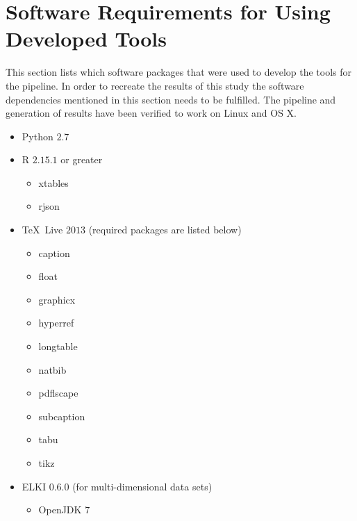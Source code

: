 ﻿\appendix
\renewcommand\thefigure{\thesection.\arabic{figure}}
\renewcommand\thetable{\thesection.\arabic{table}}
\setcounter{figure}{0}
\setcounter{table}{0}


\clearpage
\section{Software Requirements for Using Developed Tools}
\label{sec:appendix-pipelinereqs}
This section lists which software packages that were used to develop the tools for the pipeline. In order to recreate the results of this study the software dependencies mentioned in this section needs to be fulfilled. The pipeline and generation of results have been verified to work on \textsf{Linux} and \textsf{OS X}.




\begin{itemize}
\item \textsf{Python} $2.7$
\item \textsf{R} $2.15.1$ or greater
        \begin{itemize}
\item \textsf{xtables}
\item \textsf{rjson}
\end{itemize}
\item \TeX\ Live $2013$ (required packages are listed below)
        \begin{itemize}
                \item \textsf{caption}
                \item \textsf{float}
                \item \textsf{graphicx}
                \item \textsf{hyperref}
                \item \textsf{longtable}
                \item \textsf{natbib}
                \item \textsf{pdflscape}
                \item \textsf{subcaption}
                \item \textsf{tabu}
                \item \textsf{tikz}
        \end{itemize}
\item \textsf{ELKI} $0.6.0$ (for multi-dimensional data sets)        
        \begin{itemize}
\item \textsf{OpenJDK} $7$
        \end{itemize}
\end{itemize}


